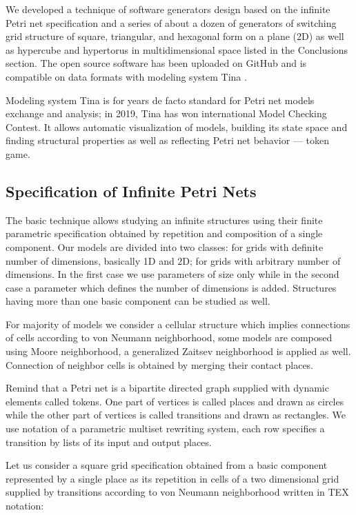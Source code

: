 \documentclass[10pt, a5paper]{article}
\begin{document}
We developed a technique of software generators design based on the infinite Petri net specification and a series of about a dozen of generators of switching grid structure of square, triangular, and hexa\-gonal form on a plane (2D) as well as hypercube and hypertorus in multidimensional space listed in the Conclusions section. The open source software has been uploaded on GitHub and is compatible on data formats with modeling system Tina \cite{bib7}.

Modeling system Tina \cite{bib7} is for years de facto standard for Petri net models exchange and analysis; in 2019, Tina has won international Model Checking Contest. It allows automatic visualization of models, building its state space and finding structural properties \cite{bib5} as well as reflecting Petri net behavior --- token game.

\subsection*{Specification of Infinite Petri Nets}

The basic technique allows studying an infinite structures using their finite parametric specification obtained by repetition and composi\-tion of a single component. Our models are divided into two classes: for grids with definite number of dimensions, basically 1D and 2D; for grids with arbitrary number of dimensions. In the first case we use parameters of size only while in the second case a parameter which defines the number of dimensions is added. Structures having more than one basic component can be studied as well.

For majority of models we consider a cellular structure which implies connections of cells according to von Neumann neighborhood, some models are composed using Moore neighborhood, a generalized Zaitsev neighborhood is applied as well. Connection of neighbor cells is obtained by merging their contact places.

Remind that a Petri net is a bipartite directed graph supplied with dynamic elements called tokens. One part of vertices is called places and drawn as circles while the other part of vertices is called transitions and drawn as rectangles. We use notation of a parametric multiset rewriting system, each row specifies a transition by lists of its input and output places.

Let us consider a square grid specification obtained from a basic component represented by a single place as its repetition in cells of a two dimensional grid supplied by transitions according to von Neumann neighborhood written in TEX notation:
\end{document}
